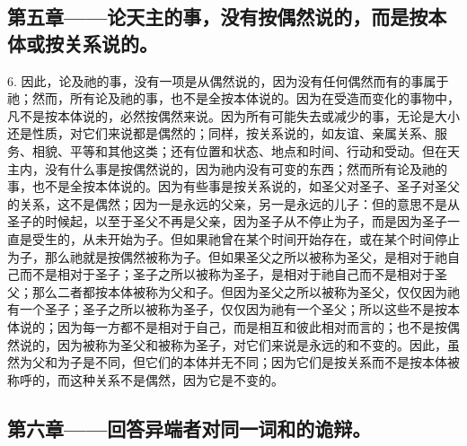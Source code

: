 
\subsection{第五章——论天主的事，没有按偶然说的，而是按本体或按关系说的。}

6. 因此，论及祂的事，没有一项是从偶然说的，因为没有任何偶然而有的事属于祂；然而，所有论及祂的事，也不是全按本体说的。因为在受造而变化的事物中，凡不是按本体说的，必然按偶然来说。因为所有可能失去或减少的事，无论是大小还是性质，对它们来说都是偶然的；同样，按关系说的，如友谊、亲属关系、服务、相貌、平等和其他这类；还有位置和状态、地点和时间、行动和受动。但在天主内，没有什么事是按偶然说的，因为祂内没有可变的东西；然而所有论及祂的事，也不是全按本体说的。因为有些事是按关系说的，如圣父对圣子、圣子对圣父的关系，这不是偶然；因为一是永远的父亲，另一是永远的儿子：但的意思不是从圣子的时候起，以至于圣父不再是父亲，因为圣子从不停止为子，而是因为圣子一直是受生的，从未开始为子。但如果祂曾在某个时间开始存在，或在某个时间停止为子，那么祂就是按偶然被称为子。但如果圣父之所以被称为圣父，是相对于祂自己而不是相对于圣子；圣子之所以被称为圣子，是相对于祂自己而不是相对于圣父；那么二者都按本体被称为父和子。但因为圣父之所以被称为圣父，仅仅因为祂有一个圣子；圣子之所以被称为圣子，仅仅因为祂有一个圣父；所以这些不是按本体说的；因为每一方都不是相对于自己，而是相互和彼此相对而言的；也不是按偶然说的，因为被称为圣父和被称为圣子，对它们来说是永远的和不变的。因此，虽然为父和为子是不同，但它们的本体并无不同；因为它们是按关系而不是按本体被称呼的，而这种关系不是偶然，因为它是不变的。\par


\subsection{第六章——回答异端者对同一词和的诡辩。}

